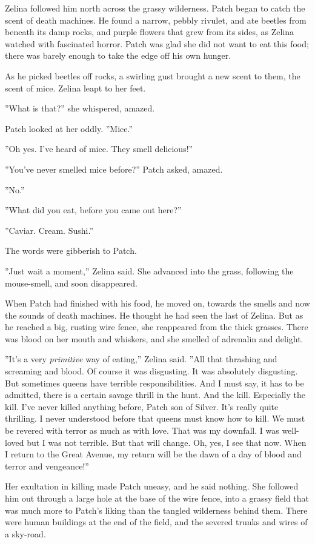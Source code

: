 \documentclass[12pt]{book}
\begin{document}
Zelina followed him north across the grassy wilderness. Patch began to
catch the scent of death machines. He found a narrow, pebbly rivulet,
and ate beetles from beneath its damp rocks, and purple flowers that
grew from its sides, as Zelina watched with fascinated horror. Patch
was glad she did not want to eat this food; there was barely enough to
take the edge off his own hunger.

As he picked beetles off rocks, a swirling gust brought a new scent to
them, the scent of mice. Zelina leapt to her feet.

''What is that?'' she whispered, amazed.

Patch looked at her oddly. ''Mice.''

''Oh yes. I've heard of mice. They smell delicious!''

''You've never smelled mice before?'' Patch asked, amazed.

''No.''

''What did you eat, before you came out here?''

''Caviar. Cream. Sushi.''

The words were gibberish to Patch.

''Just wait a moment,'' Zelina said. She advanced into the grass,
following the mouse-smell, and soon disappeared.

When Patch had finished with his food, he moved on, towards the smells
and now the sounds of death machines. He thought he had seen the last
of Zelina. But as he reached a big, rusting wire fence, she reappeared
from the thick grasses. There was blood on her mouth and whiskers, and
she smelled of adrenalin and delight.

''It's a very \textit{primitive} way of eating,'' Zelina said. ''All
that thrashing and screaming and blood. Of course it was
disgusting. It was absolutely disgusting. But sometimes queens have
terrible responsibilities. And I must say, it has to be admitted,
there is a certain savage thrill in the hunt. And the kill. Especially
the kill. I've never killed anything before, Patch son of Silver. It's
really quite thrilling. I never understood before that queens must
know how to kill. We must be revered with terror as much as with
love. That was my downfall. I was well-loved but I was not
terrible. But that will change. Oh, yes, I see that now. When I return
to the Great Avenue, my return will be the dawn of a day of blood and
terror and vengeance!''

Her exultation in killing made Patch uneasy, and he said nothing. She
followed him out through a large hole at the base of the wire fence,
into a grassy field that was much more to Patch's liking than the
tangled wilderness behind them. There were human buildings at the end
of the field, and the severed trunks and wires of a sky-road.
\end{document}
